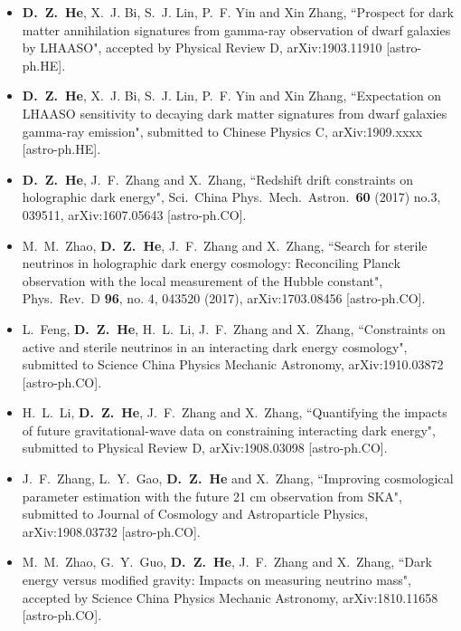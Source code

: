   \begin{itemize}[leftmargin=*]
    
    \item \textbf{D.~Z.~He}, X.~J. Bi, S.~J. Lin, P.~F. Yin and Xin Zhang, ``Prospect for dark matter annihilation signatures from gamma-ray observation of dwarf galaxies by LHAASO", accepted by Physical Review D, arXiv:1903.11910 [astro-ph.HE].
    
    \item \textbf{D.~Z.~He}, X.~J. Bi, S.~J. Lin, P.~F. Yin and Xin Zhang, ``Expectation on LHAASO sensitivity to decaying dark matter signatures from dwarf galaxies gamma-ray emission", submitted to Chinese Physics C, arXiv:1909.xxxx [astro-ph.HE].
          
    \item \textbf{D.~Z.~He}, J.~F.~Zhang and X.~Zhang, ``Redshift drift constraints on holographic dark energy", Sci.\ China Phys.\ Mech.\ Astron.\  {\bf 60} (2017) no.3, 039511, arXiv:1607.05643 [astro-ph.CO].   

    \item  M.~M.~Zhao, \textbf{D.~Z.~He}, J.~F.~Zhang and X.~Zhang, ``Search for sterile neutrinos in holographic dark energy cosmology: Reconciling Planck observation with the local measurement of the Hubble constant", Phys.\ Rev.\ D {\bf 96}, no. 4, 043520 (2017), arXiv:1703.08456 [astro-ph.CO].          

    \item L.~Feng, {\bf D.~Z.~He}, H.~L.~Li, J.~F.~Zhang and X.~Zhang, ``Constraints on active and sterile neutrinos in an interacting dark energy cosmology", submitted to Science China Physics Mechanic Astronomy, arXiv:1910.03872 [astro-ph.CO].

    \item H.~L.~Li, \textbf{D.~Z.~He}, J.~F.~Zhang and X.~Zhang, ``Quantifying the impacts of future gravitational-wave data on constraining interacting dark energy", submitted to Physical Review D, arXiv:1908.03098 [astro-ph.CO].


    \item J.~F.~Zhang, L.~Y.~Gao, \textbf{D.~Z.~He} and X.~Zhang, ``Improving cosmological parameter estimation with the future 21 cm observation from SKA", submitted to Journal of Cosmology and Astroparticle Physics, arXiv:1908.03732 [astro-ph.CO].
     
    \item  M.~M.~Zhao, G.~Y.~Guo, \textbf{D.~Z.~He}, J.~F.~Zhang and X.~Zhang, ``Dark energy versus modified gravity: Impacts on measuring neutrino mass", accepted by Science China Physics Mechanic Astronomy, arXiv:1810.11658 [astro-ph.CO].
 

\end{itemize}
